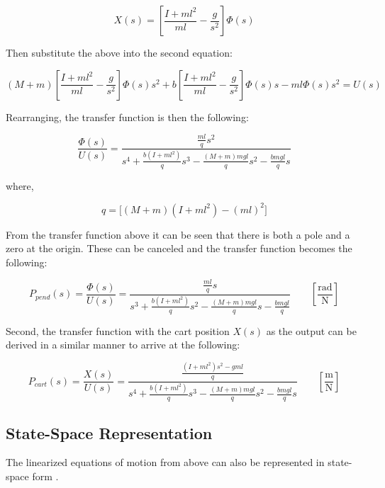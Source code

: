 \documentclass[12pt]{article}
\begin{document}
\begin{equation}
X(s) = \left[\frac{I+ml^2}{ml} - \frac{g}{s^2}\right]\Phi(s)
\end{equation}

Then substitute the above into the second equation:

\begin{equation}
(M+m)\left[\frac{I+ml^2}{ml} - \frac{g}{s^2}\right]\Phi(s)s^2 
+ b\left[\frac{I+ml^2}{ml} - \frac{g}{s^2}\right]\Phi(s)s 
- ml\Phi(s)s^2 = U(s)
\end{equation}

Rearranging, the transfer function is then the following:

\begin{equation}
\frac{\Phi(s)}{U(s)} = \frac{\tfrac{ml}{q}s^2}{s^4 + \tfrac{b(I+ml^2)}{q}s^3 - \tfrac{(M+m)mgl}{q}s^2 - \tfrac{bmgl}{q}s}
\end{equation}

where,

\begin{equation}
q = \big[(M+m)(I+ml^2) - (ml)^2\big]
\end{equation}

From the transfer function above it can be seen that there is both a pole and a zero at the origin. These can be canceled and the transfer function becomes the following:

\begin{equation}
P_{pend}(s) = \frac{\Phi(s)}{U(s)} = 
\frac{\tfrac{ml}{q}s}{s^3 + \tfrac{b(I+ml^2)}{q}s^2 - \tfrac{(M+m)mgl}{q}s - \tfrac{bmgl}{q}}
\qquad \left[\frac{\text{rad}}{\text{N}}\right]
\end{equation}

Second, the transfer function with the cart position $X(s)$ as the output can be derived in a similar manner to arrive at the following:

\begin{equation}
P_{cart}(s) = \frac{X(s)}{U(s)} = 
\frac{ \tfrac{ (I+ml^2)s^2 - gml } {q}}
{s^4 + \tfrac{b(I+ml^2)}{q}s^3 - \tfrac{(M+m)mgl}{q}s^2 - \tfrac{bmgl}{q}s}
\qquad \left[\frac{\text{m}}{\text{N}}\right]
\end{equation}

\subsection{State-Space Representation}

The linearized equations of motion from above can also be represented in state-space form .
\end{document}
